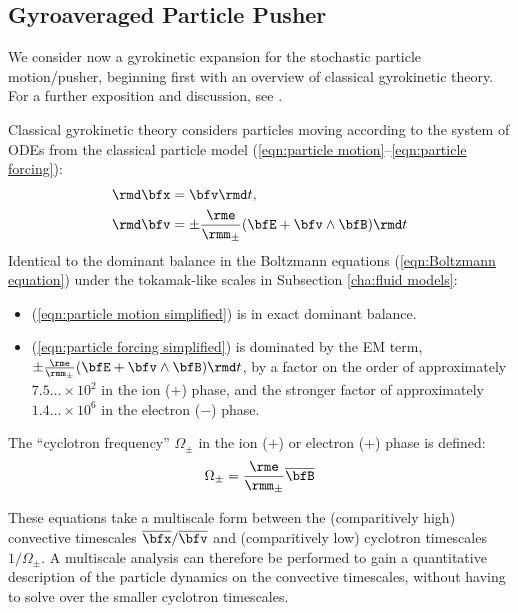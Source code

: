 \subsection*{Gyroaveraged Particle Pusher}
    We consider now a gyrokinetic expansion for the stochastic particle motion/pusher, beginning first with an overview of classical gyrokinetic theory. For a further exposition and discussion, see \cite{Woods_2006, Freidberg_2008, Chen_2015}.

    Classical gyrokinetic theory considers particles moving according to the system of ODEs from the classical particle model (\ref{eqn:particle motion}--\ref{eqn:particle forcing}):
    \begin{align}
        \rmd\bfx  &=  \bfv\rmd t,  \label{eqn:particle motion simplified}  \\
        \rmd\bfv  &=  \pm\frac{\rme}{\rmm_{\pm}}(\bfE + \bfv\wedge\bfB)\rmd t  \label{eqn:particle forcing simplified}
    \end{align}
    Identical to the dominant balance in the Boltzmann equations (\ref{eqn:Boltzmann equation}) under the tokamak-like scales in Subsection \ref{cha:fluid models}:
    \begin{itemize}
        \item  (\ref{eqn:particle motion simplified}) is in exact dominant balance.
        \item  (\ref{eqn:particle forcing simplified}) is dominated by the EM term, $\pm\frac{\rme}{\rmm_{\pm}}(\bfE + \bfv\wedge\bfB)\rmd t$, by a factor on the order of approximately $7.5\ldots\times 10^{2}$ in the ion ($+$) phase, and the stronger factor of approximately $1.4\ldots\times 10^{6}$ in the electron ($-$) phase. 
    \end{itemize}

    \begin{definition}
        The ``cyclotron frequency'' $\Omega_{\pm}$ in the ion ($+$) or electron ($+$) phase is defined: 
        \begin{equation}
            \Omega_{\pm}  =  \frac{\rme}{\rmm_{\pm}}\overline{\bfB}
        \end{equation}
    \end{definition}
    
    These equations take a multiscale form between the (comparitively high) convective timescales $\overline{\bfx}/\overline{\bfv}$ and (comparitively low) cyclotron timescales $1/\Omega_{\pm}$. A multiscale analysis \cite{Kevorkin_Cole_2012} can therefore be performed to gain a quantitative description of the particle dynamics on the convective timescales, without having to solve over the smaller cyclotron timescales.

